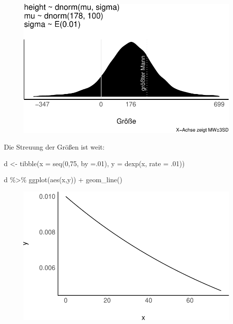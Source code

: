 \documentclass[
  a4paper,
  DIV=11]{scrreprt}
\newenvironment{Shaded}{\begin{snugshade}}{\end{snugshade}}
\newcommand{\AttributeTok}[1]{\textcolor[rgb]{0.40,0.45,0.13}{#1}}
\newcommand{\DecValTok}[1]{\textcolor[rgb]{0.68,0.00,0.00}{#1}}
\newcommand{\FunctionTok}[1]{\textcolor[rgb]{0.28,0.35,0.67}{#1}}
\newcommand{\NormalTok}[1]{\textcolor[rgb]{0.00,0.23,0.31}{#1}}
\newcommand{\OtherTok}[1]{\textcolor[rgb]{0.00,0.23,0.31}{#1}}
\newcommand{\SpecialCharTok}[1]{\textcolor[rgb]{0.37,0.37,0.37}{#1}}
\theoremstyle{definition}
\theoremstyle{remark}
\begin{document}
\begin{figure}[H]

{\centering \includegraphics{./gauss_files/figure-pdf/Kung-16-1.pdf}

}

\end{figure}

Die Streuung der Größen ist weit:

\begin{Shaded}
\begin{Highlighting}[]
\NormalTok{d }\OtherTok{\textless{}{-}} 
  \FunctionTok{tibble}\NormalTok{(}\AttributeTok{x =} \FunctionTok{seq}\NormalTok{(}\DecValTok{0}\NormalTok{,}\DecValTok{75}\NormalTok{, }\AttributeTok{by =}\NormalTok{.}\DecValTok{01}\NormalTok{),}
         \AttributeTok{y =} \FunctionTok{dexp}\NormalTok{(x, }\AttributeTok{rate =}\NormalTok{ .}\DecValTok{01}\NormalTok{))}

\NormalTok{d }\SpecialCharTok{\%\textgreater{}\%} 
  \FunctionTok{ggplot}\NormalTok{(}\FunctionTok{aes}\NormalTok{(x,y)) }\SpecialCharTok{+}
  \FunctionTok{geom\_line}\NormalTok{()}
\end{Highlighting}
\end{Shaded}

\begin{figure}[H]

{\centering \includegraphics{./gauss_files/figure-pdf/Kung-3-1.pdf}

}

\end{figure}
\end{document}
